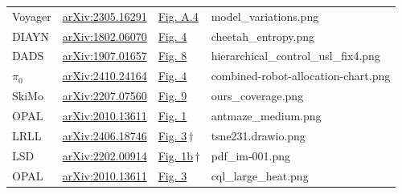 \PassOptionsToPackage{svgnames,dvipsnames}{xcolor} \documentclass[acmsmall,screen,nonacm]{acmart}
\begin{document}
\begin{table}[t]
\begin{tabular}{@{}llll@{}}
Voyager & \href{https://arxiv.org/abs/2305.16291}{arXiv:2305.16291} & \href{https://arxiv.org/abs/2305.16291}{Fig. A.4} & model\_variations.png \\
DIAYN & \href{https://arxiv.org/abs/1802.06070}{arXiv:1802.06070} & \href{https://arxiv.org/abs/1802.06070}{Fig. 4} & cheetah\_entropy.png \\
DADS & \href{https://arxiv.org/abs/1907.01657}{arXiv:1907.01657} & \href{https://arxiv.org/abs/1907.01657}{Fig. 8} & hierarchical\_control\_usl\_fix4.png \\
$\pi_0$ & \href{https://arxiv.org/abs/2410.24164}{arXiv:2410.24164} & \href{https://arxiv.org/abs/2410.24164}{Fig. 4} & combined-robot-allocation-chart.png \\
SkiMo & \href{https://arxiv.org/abs/2207.07560}{arXiv:2207.07560} & \href{https://arxiv.org/abs/2207.07560}{Fig. 9} & ours\_coverage.png \\
OPAL & \href{https://arxiv.org/abs/2010.13611}{arXiv:2010.13611} & \href{https://arxiv.org/abs/2010.13611}{Fig. 1} & antmaze\_medium.png \\
LRLL & \href{https://arxiv.org/abs/2406.18746}{arXiv:2406.18746} & \href{https://arxiv.org/abs/2406.18746}{Fig. 3}\,$\dagger$ & tsne231.drawio.png \\
LSD & \href{https://arxiv.org/abs/2202.00914}{arXiv:2202.00914} & \href{https://arxiv.org/abs/2202.00914}{Fig. 1b}\,$\dagger$ & pdf\_im-001.png \\
OPAL & \href{https://arxiv.org/abs/2010.13611}{arXiv:2010.13611} & \href{https://arxiv.org/abs/2010.13611}{Fig. 3} & cql\_large\_heat.png \\
\bottomrule
\end{tabular}
\end{table}
\end{document}
